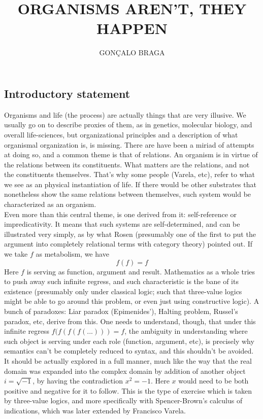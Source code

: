\documentclass[a4paper,12pt,twoside,leqno]{article}
\title{ORGANISMS AREN'T, THEY HAPPEN}
\author{\small{GONÇALO BRAGA}}
\date{}
\begin{document}
\maketitle
{}
\subsection*{Introductory statement}
Organisms and life (the process) are actually things that are very illusive. We usually go on to describe proxies of them, as in genetics, molecular biology, and overall life-sciences, but organizational principles and a description of what organismal organization is, is missing. There are have been a miriad of attempts at doing so, and a common theme is that of relations. An organism is in virtue of the relations between its constituents. What matters are the relations, and not the constituents themselves. That's why some people (Varela, etc), refer to what we see as an physical instantiation of life. If there would be other substrates that nonetheless show the same relations between themselves, such system would be characterized as an organism.\\
Even more than this central theme, is one derived from it: self-reference or impredicativity. It means that such systems are self-determined, and can be illustrated very simply, as by what Rosen (presumably one of the first to put the argument into completely relational terms with category theory) pointed out. If we take $f$ as metabolism, we have
\begin{equation}
f(f) = f
\end{equation}
Here $f$ is serving as function, argument and result. Mathematics as a whole tries to push away such infinite regress, and such characteristic is the bane of its existence (presumably only under classical logic; such that three-value logics might be able to go around this problem, or even just using constructive logic). A bunch of paradoxes: Liar paradox (Epimenides'), Halting problem, Russel's paradox, etc, derive from this. One needs to understand, though, that under this infinite regress $f(f(f(f(...))) = f$, the ambiguity in understanding where such object is serving under each role (function, argument, etc), is precisely why semantics can't be completely reduced to syntax, and this shouldn't be avoided. It should be actually explored in a full manner, much like the way that the real domain was expanded into the complex domain by addition of another object $i = \sqrt{-1}$, by having the contradiction $x^2 = -1$. Here $x$ would need to be both positive and negative for it to follow. This is the type of exercise which is taken by three-value logics, and more specifically with Spencer-Brown's calculus of indications, which was later extended by Francisco Varela. 
\end{document}
